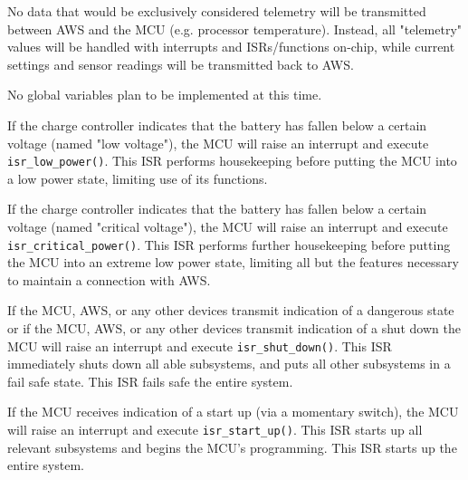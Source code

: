 \begin{flushleft}
    No data that would be exclusively considered telemetry will be transmitted 
    between AWS and the MCU (e.g. processor temperature). Instead, all
    "telemetry" values will be handled with interrupts and ISRs/functions
    on-chip, while current settings and sensor readings will be transmitted
    back to AWS.
\end{flushleft}
\begin{flushleft}
    No global variables plan to be implemented at this time.
\end{flushleft}
\begin{flushleft}
\end{flushleft}
\begin{flushleft}
    If the charge controller indicates that the battery has fallen below a
    certain voltage (named "low voltage"), the MCU will raise an interrupt and
    execute \texttt{isr\_low\_power()}. This ISR performs housekeeping before
    putting the MCU into a low power state, limiting use of its functions.
\end{flushleft}
\begin{flushleft}
    If the charge controller indicates that the battery has fallen below a
    certain voltage (named "critical voltage"), the MCU will raise an interrupt
    and execute \texttt{isr\_critical\_power()}. This ISR performs further 
    housekeeping before putting the MCU into an extreme low power state,
    limiting all but the features necessary to maintain a connection with AWS.
\end{flushleft}
\begin{flushleft}
    If the MCU, AWS, or any other devices transmit indication of a dangerous
    state or if the MCU, AWS, or any other devices transmit indication of a
    shut down the MCU will raise an interrupt and execute
    \texttt{isr\_shut\_down()}. This ISR immediately shuts down all able
    subsystems, and puts all other subsystems in a fail safe state. This ISR
    fails safe the entire system.
\end{flushleft}
\begin{flushleft}
    If the MCU receives indication of a start up (via a momentary switch), the
    MCU will raise an interrupt and execute \texttt{isr\_start\_up()}. This ISR
    starts up all relevant subsystems and begins the MCU's programming. This
    ISR starts up the entire system.
\end{flushleft}
